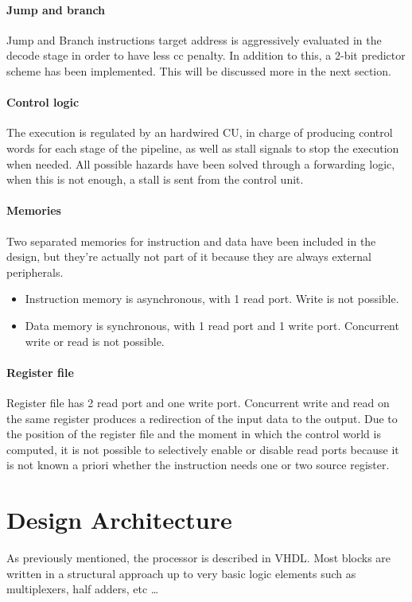 \documentclass[12pt]{article}
\begin{document}
\paragraph{Jump and branch}
Jump and Branch instructions target address is aggressively evaluated in the decode stage in order to have less cc penalty.
In addition to this, a 2-bit predictor scheme has been implemented. This will be discussed more in the next section.
\paragraph{Control logic}
The execution is regulated by an hardwired CU, in charge of producing control words for each stage of the pipeline, as well as stall signals to stop the execution when needed.
All possible hazards have been solved through a forwarding logic, when this is not enough, a stall is sent from the control unit.
\paragraph{Memories}
Two separated memories for instruction and data have been included in the design, but they're actually not part of it because they are always external peripherals.
\begin{itemize}
\item Instruction memory is asynchronous, with 1 read port. Write is not possible.
\item Data memory is synchronous, with 1 read port and 1 write port. Concurrent write or read is not possible.
\end{itemize}
\paragraph{Register file}
Register file has 2 read port and one write port. Concurrent write and read on the same register produces a redirection of the input data to the output.
Due to the position of the register file and the moment in which the control world is computed, it is not possible to selectively enable or disable read ports because it is not known a priori whether the instruction needs one or two source register.

\section{Design Architecture}\label{Design}
As previously mentioned, the processor is described in VHDL. Most blocks are written in a structural approach up to very basic logic elements such as multiplexers, half adders, etc \ldots
\end{document}
